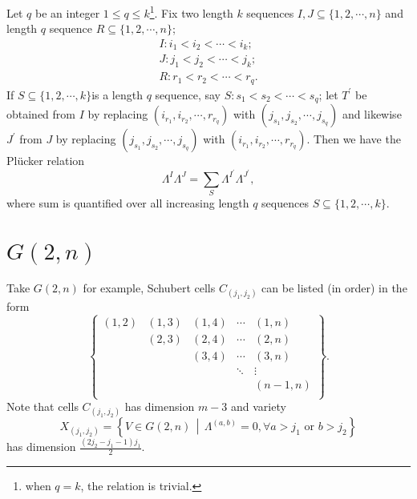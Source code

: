 \documentclass[11pt]{homework}
\begin{document}
\begin{proposition}
    Let $q$ be an integer $1\leq q \leq k$\footnote{when $q=k$, the relation is trivial.}.
    Fix two length $k$ sequences $I,J\subseteq \{1,2,\cdots,n\}$ and length $q$ sequence $R \subseteq \{1,2,\cdots,n\}$;
    \begin{align*}
        I: i_1 < i_2 < \cdots < i_k;\\
        J: j_1 < j_2 < \cdots < j_k;\\
        R: r_1 < r_2 < \cdots < r_q.
    \end{align*}
    If $S\subseteq \{1,2,\cdots,k\}$is a length $q$ sequence, say $S: s_1 < s_2 < \cdots < s_q$; let $T^\prime$ be obtained from $I$ by replacing $(i_{r_1}, i_{r_2}, \cdots, r_{r_q})$ with $(j_{s_1}, j_{s_2}, \cdots, j_{s_q})$ and likewise $J^\prime$ from $J$ by replacing $(j_{s_1}, j_{s_2}, \cdots, j_{s_q})$ with $(i_{r_1}, i_{r_2}, \cdots, r_{r_q})$.
    Then we have the Plücker relation
    \begin{equation*}
        \Lambda^I \Lambda^J = \sum_S \Lambda^{I^\prime} \Lambda^{J^\prime},
    \end{equation*}
    where sum is quantified over all increasing length $q$ sequences $S\subseteq \{1,2,\cdots,k\}$.
\end{proposition}

\section{$G(2,n)$}
Take $G(2,n)$ for example, Schubert cells $C_{(j_1,j_2)}$ can be listed (in order) in the form
\begin{equation*}
    \begin{Bmatrix}
        (1,2) & (1,3) & (1,4) & \cdots & (1,n)\\
              & (2,3) & (2,4) & \cdots & (2,n)\\
              &       & (3,4) & \cdots & (3,n)\\
              &       &       & \ddots & \vdots\\
              &       &       &        & (n-1,n)\\
    \end{Bmatrix}.
\end{equation*}
Note that cells $C_{(j_1,j_2)}$ has dimension $m-3$ and variety
\begin{equation*}
    X_{(j_1,j_2)} = \left\{V \in G(2, n) \, \middle | \, \Lambda^{(a,b)}=0, \forall a > j_1 \text{ or } b > j_2 \right\}
\end{equation*}
has dimension $\frac{\left(2j_2-j_1-1\right)j_1}{2}$.
\end{document}
